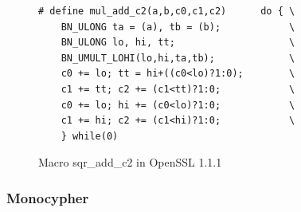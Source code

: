 \begin{figure}
    \centering
    \begin{lstlisting}[xleftmargin=.02\textwidth,xrightmargin=.01\textwidth]
# define mul_add_c2(a,b,c0,c1,c2)      do { \
    BN_ULONG ta = (a), tb = (b);            \
    BN_ULONG lo, hi, tt;                    \
    BN_UMULT_LOHI(lo,hi,ta,tb);             \
    c0 += lo; tt = hi+((c0<lo)?1:0);        \
    c1 += tt; c2 += (c1<tt)?1:0;            \
    c0 += lo; hi += (c0<lo)?1:0;            \
    c1 += hi; c2 += (c1<hi)?1:0;            \
    } while(0)
\end{lstlisting}
    \vspace*{-6pt}
    \caption{Macro \textsf{sqr\_add\_c2} in OpenSSL 1.1.1}
    \label{fig:new_sqr2}
    \vspace*{-6pt}
\end{figure}

\subsubsection{Monocypher}


